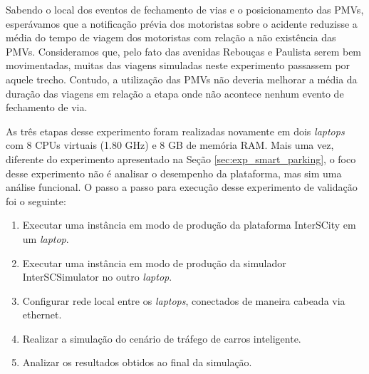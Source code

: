 Sabendo o local dos eventos de fechamento de vias e o posicionamento das PMVs, esperávamos que a notificação prévia dos motoristas sobre o acidente reduzisse a média do tempo de viagem dos motoristas
com relação a não existência das PMVs.
Consideramos que, pelo fato das avenidas Rebouças e Paulista serem bem movimentadas, muitas das viagens simuladas neste experimento passassem por aquele trecho. 
Contudo, a utilização das PMVs não deveria melhorar a média da duração das viagens em relação a etapa onde não acontece nenhum evento de fechamento de via.

As três etapas desse experimento foram realizadas novamente em dois \textit{laptops} com 8 CPUs virtuais (1.80 GHz) e 8 GB de memória RAM.
Mais uma vez, diferente do experimento apresentado na Seção \ref{sec:exp_smart_parking}, o foco desse experimento não é analisar o desempenho da plataforma, mas sim uma análise funcional. 
O passo a passo para execução desse experimento de validação foi o seguinte:

\begin{enumerate}
    \item Executar uma instância em modo de produção da plataforma InterSCity em um \textit{laptop}.

    \item Executar uma instância em modo de produção da simulador InterSCSimulator no outro \textit{laptop}.

    \item Configurar rede local entre os \textit{laptops}, conectados de maneira cabeada via ethernet.

    \item Realizar a simulação do cenário de tráfego de carros inteligente.

    \item Analizar os resultados obtidos ao final da simulação.
\end{enumerate}

